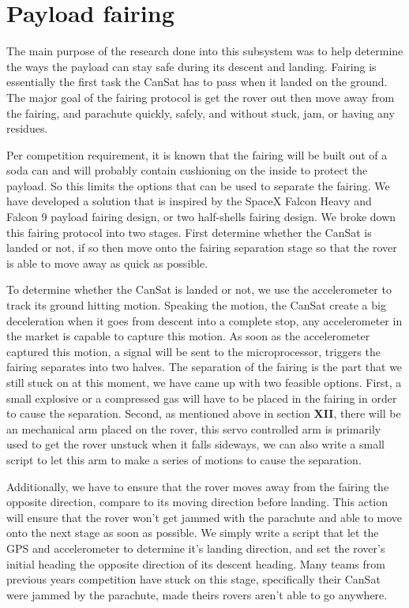 \documentclass[10pt,letterpaper,onecolumn,journal]{IEEEtran}
\begin{document}
\section{Payload fairing}
The main purpose of the research done into this subsystem was to help determine the ways the payload can stay safe during its descent and landing. Fairing is essentially the first task the CanSat has to pass when it landed on the ground. The major goal of the fairing protocol is get the rover out then move away from the fairing, and parachute quickly, safely, and without stuck, jam, or having any residues. \vspace{.3cm}
\par  
Per competition requirement, it is known that the fairing will be built out of a soda can and will probably contain cushioning on the inside to protect the payload. So this limits the options that can be used to separate the fairing. We have developed a solution that is inspired by the SpaceX Falcon Heavy and Falcon 9 payload fairing design, or two half-shells fairing design.\cite{spacex_2013} We broke down this fairing protocol into two stages. First determine whether the CanSat is landed or not, if so then move onto the fairing separation stage so that the rover is able to move away as quick as possible. \vspace{.3cm}
\par  
To determine whether the CanSat is landed or not, we use the accelerometer to track its ground hitting motion. Speaking the motion, the CanSat create a big deceleration when it goes from descent into a complete stop, any accelerometer in the market is capable to capture this motion. As soon as the accelerometer captured this motion, a signal will be sent to the microprocessor, triggers the fairing separates into two halves. The separation of the fairing is the part that we still stuck on at this moment, we have came up with two feasible options. First, a small explosive or a compressed gas will have to be placed in the fairing in order to cause the separation. Second, as mentioned above in section \textbf{XII}, there will be an mechanical arm placed on the rover, this servo controlled arm is primarily used to get the rover unstuck when it falls sideways, we can also write a small script to let this arm to make a series of motions to cause the separation.\vspace{.3cm}
\par  
Additionally, we have to ensure that the rover moves away from the fairing the opposite direction, compare to its moving direction before landing. This action will ensure that the rover won't get jammed with the parachute and able to move onto the next stage as soon as possible. We simply write a script that let the GPS and accelerometer to determine it's landing direction, and set the rover's initial heading the opposite direction of its descent heading. Many teams from previous years competition have stuck on this stage, specifically their CanSat were jammed by the parachute, made theirs rovers aren't able to go anywhere.\vspace{.3cm}

\clearpage
{}


\end{document}
